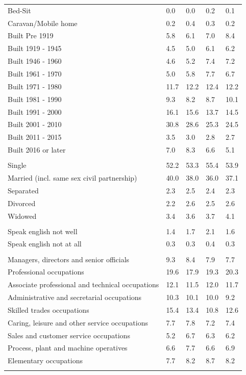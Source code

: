 \documentclass{article}
\begin{document}
\begin{table}[h]
\begin{tabular}{KTTTT}
Bed-Sit & 0.0& 0.0& 0.2& 0.1\\
Caravan/Mobile home & 0.2& 0.4& 0.3& 0.2\\
    \hline
Built Pre 1919 & 5.8& 6.1& 7.0& 8.4\\
Built 1919 - 1945 & 4.5& 5.0& 6.1& 6.2\\
Built  1946 - 1960 & 4.6& 5.2& 7.4& 7.2\\
Built  1961 - 1970 & 5.0& 5.8& 7.7& 6.7\\
Built  1971 - 1980 & 11.7& 12.2& 12.4& 12.2\\
Built  1981 - 1990 &  9.3&  8.2&  8.7& 10.1\\
Built  1991 - 2000 & 16.1& 15.6& 13.7& 14.5\\
Built  2001 - 2010 & 30.8& 28.6& 25.3& 24.5\\
Built  2011 - 2015 & 3.5& 3.0& 2.8& 2.7\\
Built  2016 or later & 7.0& 8.3& 6.6& 5.1\\
\hline
    \\
    \hline
Single & 52.2& 53.3& 55.4& 53.9\\
Married (incl. same sex civil partnership) & 40.0& 38.0& 36.0& 37.1\\
Separated  & 2.3& 2.5& 2.4& 2.3\\
Divorced  & 2.2& 2.6& 2.5& 2.6\\
Widowed & 3.4& 3.6& 3.7& 4.1\\
\hline
    \\ 
    \hline
Speak english not well & 1.4& 1.7& 2.1& 1.6\\
Speak english not at all & 0.3& 0.3& 0.4& 0.3\\
\hline
    \\
    \hline
Managers, directors and senior officials & 9.3& 8.4& 7.9& 7.7\\
Professional occupations & 19.6& 17.9& 19.3& 20.3\\
Associate professional and technical occupations & 12.1& 11.5& 12.0& 11.7\\
Administrative and secretarial occupations & 10.3& 10.1& 10.0&  9.2\\
Skilled trades occupations & 15.4& 13.4& 10.8& 12.6\\
Caring, leisure and other service occupations & 7.7& 7.8& 7.2& 7.4\\
Sales and customer service occupations & 5.2& 6.7& 6.3& 6.2\\
Process, plant and machine operatives & 6.6& 7.7& 6.6& 6.9\\
Elementary occupations & 7.7& 8.2& 8.7& 8.2\\
\hline
\end{tabular}
\end{table}
\end{document}
